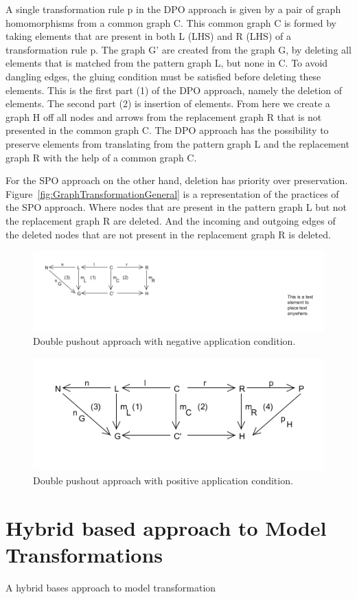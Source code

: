A single transformation rule p in the DPO approach is given by a pair of graph
homomorphisms from a common graph C. This common graph C is formed by taking
elements that are present in both L (LHS) and R (LHS) of a transformation rule
p. The graph G' are created from the graph G, by deleting all elements that is
matched from the pattern graph L, but none in C. To avoid dangling edges,
the gluing condition must be satisfied before deleting these elements. This is
the first part (1) of the DPO approach, namely the deletion of elements. The
second part (2) is insertion of elements. From here we create a graph H off all
nodes and arrows from the replacement graph R that is not presented in the
common graph C. The DPO approach has the possibility to preserve elements from
translating from the pattern graph L and the replacement graph R with the help
of a common graph C.

For the SPO approach on the other hand, deletion has priority over preservation.
Figure~\ref{fig:GraphTransformationGeneral} is a representation of the practices
of the SPO approach. Where nodes that are present in the pattern graph L but not
the replacement graph R are deleted. And the incoming and outgoing edges of the
deleted nodes that are not present in the replacement graph R is deleted.

\begin{figure}[H]
	\centering
	\includegraphics[scale=0.7]{./Figures/Double_Pushout_NAC.png}
	\caption[The Double Pushout approach with NAC]
	{Double pushout approach with negative application condition.}
	\label{fig:DPO_NAC}
\end{figure}

\begin{figure}[H]
	\centering
	\includegraphics[scale=0.7]{./Figures/Double_Pushout_PAC.png}
	\caption[The Double Pushout approach with PAC]
	{Double pushout approach with positive application condition.}
	\label{fig:DPO_NAC}
\end{figure}

\section{Hybrid based approach to Model Transformations}

A hybrid bases approach to model transformation 



